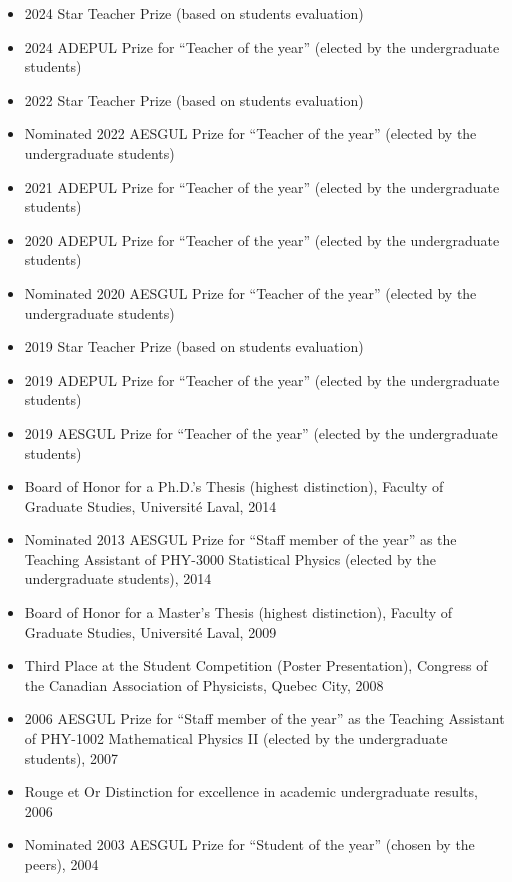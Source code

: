 \documentclass[11pt]{article}
\begin{document}
\begin{itemize}
  \item 2024 Star Teacher Prize (based on students evaluation)
  \item 2024 ADEPUL Prize for ``Teacher of the year'' (elected by the undergraduate students)
  \item 2022 Star Teacher Prize (based on students evaluation)
  \item Nominated 2022 AESGUL Prize for ``Teacher of the year'' (elected by the undergraduate students)
  \item 2021 ADEPUL Prize for ``Teacher of the year'' (elected by the undergraduate students)
  \item 2020 ADEPUL Prize for ``Teacher of the year'' (elected by the undergraduate students)
  \item Nominated 2020 AESGUL Prize for ``Teacher of the year'' (elected by the undergraduate students)
  \item 2019 Star Teacher Prize (based on students evaluation)
  \item 2019 ADEPUL Prize for ``Teacher of the year'' (elected by the undergraduate students)
  \item 2019 AESGUL Prize for ``Teacher of the year'' (elected by the undergraduate students)
  \item Board of Honor for a Ph.D.'s Thesis (highest distinction), Faculty of Graduate Studies, Universit\'e Laval, 2014
  \item Nominated 2013 AESGUL Prize for ``Staff member of the year'' as the Teaching Assistant of PHY-3000 Statistical Physics (elected by the undergraduate students), 2014
  \item Board of Honor for a Master's Thesis (highest distinction), Faculty of Graduate Studies, Universit\'e Laval, 2009
  \item Third Place at the Student Competition (Poster Presentation), Congress of the Canadian Association of Physicists, Quebec City, 2008
  \item 2006 AESGUL Prize for ``Staff member of the year'' as the Teaching Assistant of PHY-1002 Mathematical Physics II (elected by the undergraduate students), 2007
  \item Rouge et Or Distinction for excellence in academic undergraduate results, 2006
  \item Nominated 2003 AESGUL Prize for ``Student of the year'' (chosen by the peers), 2004
\end{itemize} \vspace{0.75\baselineskip}
\end{document}
